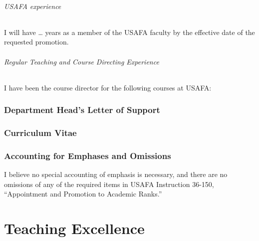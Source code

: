 \documentclass[11pt,titlepage]{article}
\begin{document}
\paragraph{USAFA experience}
I will have \dots{} years as a member of the USAFA faculty by the effective date of the requested promotion.

\paragraph{Regular Teaching and Course Directing Experience}
I have been the course director for the following courses at USAFA:

\section{Department Head's Letter of Support}  %

%

\section{Curriculum Vitae}  %

%

\section{Accounting for Emphases and Omissions}  %

I believe no special accounting of emphasis is necessary, and there are no omissions of any of the required items in USAFA Instruction 36-150, ``Appointment and Promotion to Academic Ranks.''


\part{Teaching Excellence}\label{part:teaching excellence}

\end{document}
